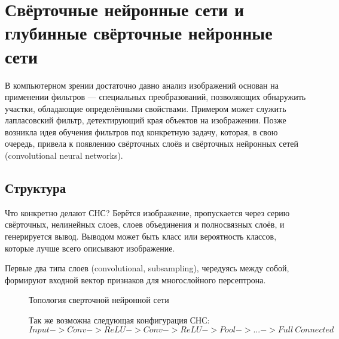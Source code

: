 \documentclass[paper=a4, fontsize=11pt]{scrartcl} %
\numberwithin{equation}{section} %
\numberwithin{figure}{section} %
\numberwithin{table}{section} %
\begin{document}
	
	
	\section{Свёрточные нейронные сети и глубинные свёрточные нейронные сети}
	
	 В компьютерном зрении достаточно давно анализ изображений основан на применении фильтров — специальных преобразований, позволяющих обнаружить участки, обладающие определёнными свойствами. Примером может служить лапласовский фильтр, детектирующий края объектов на изображении. Позже возникла идея обучения фильтров под конкретную задачу, которая, в свою очередь, привела к появлению свёрточных слоёв и свёрточных нейронных сетей (convolutional neural networks).
	 
	\subsection{Структура}
	Что конкретно делают СНС? Берётся изображение, пропускается через серию свёрточных, нелинейных слоев, слоев объединения и полносвязных слоёв, и генерируется вывод. Выводом может быть класс или вероятность классов, которые лучше всего описывают изображение.

	Первые два типа слоев (convolutional, subsampling), чередуясь между собой, формируют входной вектор признаков для многослойного персептрона.
	
	\begin{figure}[h!]
		\caption{Топология сверточной нейронной сети}
	\end{figure}

	\begin{figure}[h!]
		Так же возможна следующая конфигурация СНС:
		$$Input->Conv->ReLU->Conv->ReLU->Pool->...->Full\: Connected$$
	\end{figure}
	
	
\end{document}
